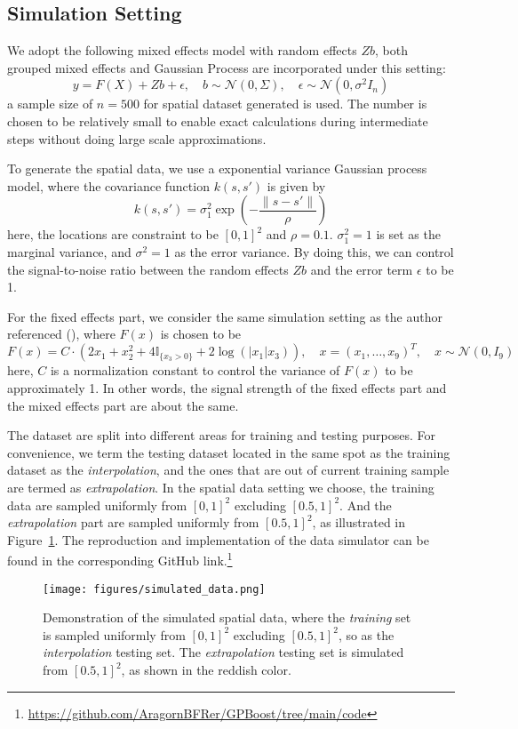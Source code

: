 \documentclass[12pt,a4paper]{article}
\begin{document}
\subsection{Simulation Setting}
We adopt the following mixed effects model with random effects $Zb$, both grouped mixed effects and Gaussian Process are incorporated under this setting: 
$$
y = F(X) + Zb + \epsilon, \quad b \sim \mathcal{N}(0, \Sigma), \quad \epsilon \sim \mathcal{N}(0, \sigma^2 I_n)
$$
a sample size of $n = 500$ for spatial dataset generated is used. The number is chosen to be relatively small to enable exact calculations during intermediate steps without doing large scale approximations.

To generate the spatial data, we use a exponential variance Gaussian process model, where the covariance function $k(s, s')$ is given by 
$$
k(s, s') = \sigma_1^2 \exp\left(-\frac{\|s - s'\|}{\rho}\right)
$$
here, the locations are constraint to be $[0,1]^2$ and $\rho = 0.1$. $\sigma_1^2 = 1$ is set as the marginal variance, and $\sigma^2 = 1$ as the error variance. By doing this, we can control the signal-to-noise ratio between the random effects $Zb$ and the error term $\epsilon$ to be 1.

For the fixed effects part, we consider the same simulation setting as the author referenced (\cite{Hajjem03062014}), where $F(x)$ is chosen to be 
$$
F(x) = C \cdot \left(2x_1 + x_2^2 + 4\mathbb{I}_{\{x_3>0\}} + 2 \log(|x_1|x_3) \right), \quad x = (x_1, \ldots, x_9)^{T}, \quad x \sim \mathcal{N}(0, I_9)
$$
here, $C$ is a normalization constant to control the variance of $F(x)$ to be approximately 1. In other words, the signal strength of the fixed effects part and the mixed effects part are about the same.

The dataset are split into different areas for training and testing purposes. For convenience, we term the testing dataset located in the same spot as the training dataset as the \textit{interpolation}, and the ones that are out of current training sample are termed as \textit{extrapolation}. In the spatial data setting we choose, the training data are sampled uniformly from $[0, 1]^2$ excluding $[0.5, 1]^2$. And the \textit{extrapolation} part are sampled uniformly from $[0.5, 1]^2$, as illustrated in Figure~\ref{fig:simulated_data}. The reproduction and implementation of the data simulator can be found in the corresponding GitHub link.\footnote{\url{https://github.com/AragornBFRer/GPBoost/tree/main/code}}


\begin{figure}
    \centering
    \texttt{[image: figures/simulated\_data.png]}
    \caption{\small Demonstration of the simulated spatial data, where the \textit{training} set is sampled uniformly from $[0, 1]^2$ excluding $[0.5, 1]^2$, so as the \textit{interpolation} testing set. The \textit{extrapolation} testing set is simulated from $[0.5, 1]^2$, as shown in the reddish color. }
    \label{fig:simulated_data}
\end{figure}
\end{document}
